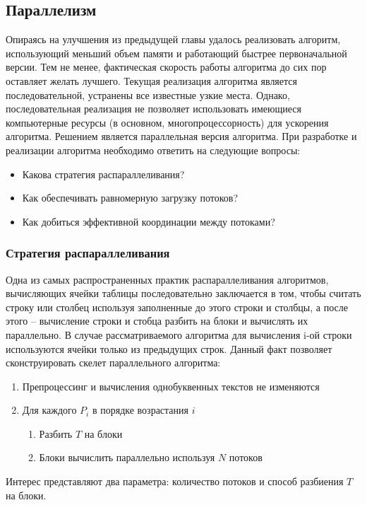 \documentclass[14pt]{article}
\begin{document}

\subsection{Параллелизм}
Опираясь на улучшения из предыдущей главы удалось реализовать алгоритм, использующий меньший объем памяти и работающий быстрее первоначальной версии. Тем не менее, фактическая скорость работы алгоритма до сих пор оставляет желать лучшего. Текущая реализация алгоритма является последовательной, устранены все известные узкие места. Однако, последовательная реализация не позволяет использовать имеющиеся компьютерные ресурсы (в основном, многопроцессорность) для ускорения алгоритма. Решением является параллельная версия алгоритма. При разработке и реализации алгоритма необходимо ответить на следующие вопросы:
\begin{itemize}
\item Какова стратегия распараллеливания?
\item Как обеспечивать равномерную загрузку потоков?
\item Как добиться эффективной координации между потоками?
\end{itemize}


\subsubsection{Стратегия распараллеливания}

Одна из самых распространенных практик распараллеливания алгоритмов, вычисляющих ячейки таблицы последовательно заключается в том, чтобы считать строку или столбец используя заполненные до этого строки и столбцы, а после этого -- вычисление строки и стобца разбить на блоки и вычислять их параллельно. В случае рассматриваемого алгоритма для вычисления i-ой строки используются ячейки только из предыдущих строк. Данный факт позволяет сконструировать скелет параллельного алгоритма:
\begin{enumerate}
\item Препроцессинг и вычисления однобуквенных текстов не изменяются
\item Для каждого $P_i$ в порядке возрастания $i$
	\begin{enumerate}
	\item Разбить $T$ на блоки
	\item Блоки вычислить параллельно используя $N$ потоков
	\end{enumerate}
\end{enumerate}
Интерес представляют два параметра: количество потоков и способ разбиения $T$ на блоки.
\end{document}
